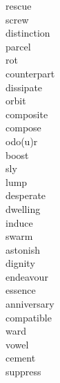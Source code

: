 \documentclass[a4paper, 10pt]{ctexart}
\begin{document}
\begin{multicols*}{2}
\begin{description}
\item[rescue]

\item[screw]

\item[distinction]

\item[parcel]

\item[rot]

\item[counterpart]

\item[dissipate]

\item[orbit]

\item[composite]

\item[compose]

\item[odo(u)r]

\item[boost]

\item[sly]

\item[lump]

\item[desperate]

\item[dwelling]

\item[induce]

\item[swarm]

\item[astonish]

\item[dignity]

\item[endeavour]

\item[essence]

\item[anniversary]

\item[compatible]

\item[ward]

\item[vowel]

\item[cement]

\item[suppress]


\end{description}
\end{multicols*}
\end{document}
